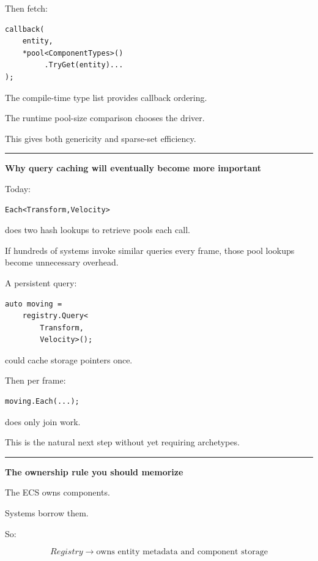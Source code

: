 Then fetch:

\begin{verbatim}
callback(
    entity,
    *pool<ComponentTypes>()
         .TryGet(entity)...
);
\end{verbatim}

The compile-time type list provides callback ordering.

The runtime pool-size comparison chooses the driver.

This gives both genericity and sparse-set efficiency.

\begin{center}\rule{0.5\linewidth}{0.5pt}\end{center}

\textbf{Why query caching will eventually become more important}

Today:

\begin{verbatim}
Each<Transform,Velocity>
\end{verbatim}

does two  hash lookups to retrieve pools each call.

If hundreds of systems invoke similar queries every frame, those pool lookups become unnecessary overhead.

A persistent query:

\begin{verbatim}
auto moving =
    registry.Query<
        Transform,
        Velocity>();
\end{verbatim}

could cache storage pointers once.

Then per frame:

\begin{verbatim}
moving.Each(...);
\end{verbatim}

does only join work.

This is the natural next step without yet requiring archetypes.

\begin{center}\rule{0.5\linewidth}{0.5pt}\end{center}

\textbf{The ownership rule you should memorize}

The ECS owns components.

Systems borrow them.

So:

\[
\boxed{
Registry
\rightarrow
\text{owns entity metadata and component storage}
}
\]

